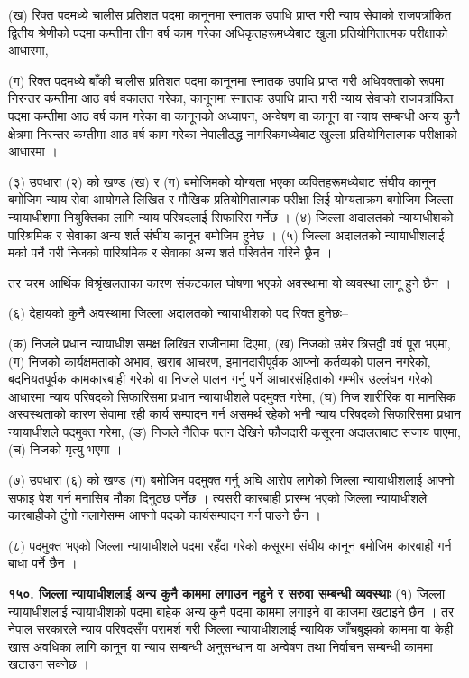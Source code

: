 (ख) रिक्त पदमध्ये चालीस प्रतिशत पदमा कानूनमा स्नातक उपाधि प्राप्त गरी न्याय सेवाको राजपत्रांकित द्वितीय श्रेणीको पदमा कम्तीमा तीन वर्ष काम गरेका अधिकृतहरूमध्येबाट खुला प्रतियोगितात्मक परीक्षाको आधारमा,

(ग) रिक्त पदमध्ये बाँकी चालीस प्रतिशत पदमा कानूनमा स्नातक उपाधि प्राप्त गरी अधिवक्ताको रूपमा निरन्तर कम्तीमा आठ वर्ष वकालत गरेका, कानूनमा स्नातक उपाधि प्राप्त गरी न्याय सेवाको राजपत्रांकित पदमा कम्तीमा आठ वर्ष काम गरेका वा कानूनको अध्यापन, अन्वेषण वा कानून वा न्याय सम्बन्धी अन्य कुनै क्षेत्रमा निरन्तर कम्तीमा आठ वर्ष काम गरेका नेपालीठद्ध नागरिकमध्येबाट खुल्ला प्रतियोगितात्मक परीक्षाको आधारमा ।

(३) उपधारा (२) को खण्ड (ख) र (ग) बमोजिमको योग्यता भएका व्यक्तिहरूमध्येबाट संघीय कानून बमोजिम न्याय सेवा आयोगले लिखित र मौखिक प्रतियोगितात्मक परीक्षा लिई योग्यताक्रम बमोजिम जिल्ला न्यायाधीशमा नियुक्तिका लागि न्याय परिषदलाई सिफारिस गर्नेछ ।
(४) जिल्ला अदालतको न्यायाधीशको पारिश्रमिक र सेवाका अन्य शर्त संघीय कानून बमोजिम हुनेछ ।
(५) जिल्ला अदालतको न्यायाधीशलाई मर्का पर्ने गरी निजको पारिश्रमिक र सेवाका अन्य शर्त परिवर्तन गरिने छ्रैन ।

तर चरम आर्थिक विश्रृंखलताका कारण संकटकाल घोषणा भएको अवस्थामा यो व्यवस्था लागू हुने छैन ।

(६) देहायको कुनै अवस्थामा जिल्ला अदालतको न्यायाधीशको पद रिक्त हुनेछः–

(क) निजले प्रधान न्यायाधीश समक्ष लिखित राजीनामा दिएमा,
(ख) निजको उमेर त्रिसठ्ठी वर्ष पूरा भएमा,
(ग) निजको कार्यक्षमताको अभाव, खराब आचरण, इमानदारीपूर्वक आफ्नो कर्तव्यको पालन नगरेको, बदनियतपूर्वक कामकारबाही गरेको वा निजले पालन गर्नु पर्ने आचारसंहिताको गम्भीर उल्लंघन गरेको आधारमा न्याय परिषदको सिफारिसमा प्रधान न्यायाधीशले पदमुक्त
गरेमा,
(घ) निज शारीरिक वा मानसिक अस्वस्थताको कारण सेवामा रही कार्य सम्पादन गर्न असमर्थ रहेको भनी न्याय परिषदको सिफारिसमा प्रधान न्यायाधीशले पदमुक्त गरेमा,
(ङ) निजले नैतिक पतन देखिने फौजदारी कसूरमा अदालतबाट सजाय पाएमा,
(च) निजको मृत्यु भएमा ।

(७) उपधारा (६) को खण्ड (ग) बमोजिम पदमुक्त गर्नु अघि आरोप लागेको जिल्ला न्यायाधीशलाई आफ्नो सफाइ पेश गर्न मनासिब मौका दिनुठछ पर्नेछ । त्यसरी कारबाही प्रारम्भ भएको जिल्ला न्यायाधीशले कारबाहीको टुंगो नलागेसम्म आफ्नो पदको कार्यसम्पादन गर्न पाउने छैन ।

(८) पदमुक्त भएको जिल्ला न्यायाधीशले पदमा रहँदा गरेको कसूरमा संघीय कानून बमोजिम कारबाही गर्न बाधा पर्ने छैन ।

\textbf{१५०. जिल्ला न्यायाधीशलाई अन्य कुनै काममा लगाउन नहुने र सरुवा सम्बन्धी व्यवस्थाः} (१) जिल्ला न्यायाधीशलाई न्यायाधीशको पदमा बाहेक अन्य कुनै पदमा काममा लगाइने वा काजमा खटाइने छैन । तर नेपाल सरकारले न्याय परिषदसँग परामर्श गरी जिल्ला न्यायाधीशलाई न्यायिक जाँचबुझको काममा वा केही खास अवधिका लागि कानून वा न्याय सम्बन्धी अनुसन्धान वा अन्वेषण तथा निर्वाचन सम्बन्धी काममा खटाउन सक्नेछ ।

